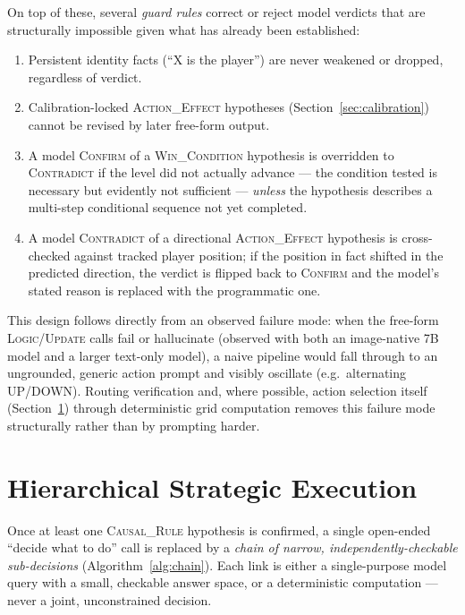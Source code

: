 \documentclass{article}
\begin{document}
On top of these, several \emph{guard rules} correct or reject model
verdicts that are structurally impossible given what has already been
established:
\begin{enumerate}[nosep]
\item Persistent identity facts (``X is the player'') are never
weakened or dropped, regardless of verdict.
\item Calibration-locked \textsc{Action\_Effect} hypotheses
(Section~\ref{sec:calibration}) cannot be revised by later free-form
output.
\item A model \textsc{Confirm} of a \textsc{Win\_Condition} hypothesis
is overridden to \textsc{Contradict} if the level did not actually
advance — the condition tested is necessary but evidently not
sufficient — \emph{unless} the hypothesis describes a multi-step
conditional sequence not yet completed.
\item A model \textsc{Contradict} of a directional
\textsc{Action\_Effect} hypothesis is cross-checked against tracked
player position; if the position in fact shifted in the predicted
direction, the verdict is flipped back to \textsc{Confirm} and the
model's stated reason is replaced with the programmatic one.
\end{enumerate}

This design follows directly from an observed failure mode: when the
free-form \textsc{Logic}/\textsc{Update} calls fail or hallucinate
(observed with both an image-native 7B model and a larger text-only
model), a naive pipeline would fall through to an ungrounded, generic
action prompt and visibly oscillate (e.g.\ alternating UP/DOWN). Routing
verification and, where possible, action selection itself
(Section~\ref{sec:chain}) through deterministic grid computation removes
this failure mode structurally rather than by prompting harder.

\section{Hierarchical Strategic Execution}
\label{sec:chain}

Once at least one \textsc{Causal\_Rule} hypothesis is confirmed, a
single open-ended ``decide what to do'' call is replaced by a
\emph{chain of narrow, independently-checkable sub-decisions}
(Algorithm~\ref{alg:chain}). Each link is either a single-purpose model
query with a small, checkable answer space, or a deterministic
computation — never a joint, unconstrained decision.
\end{document}
